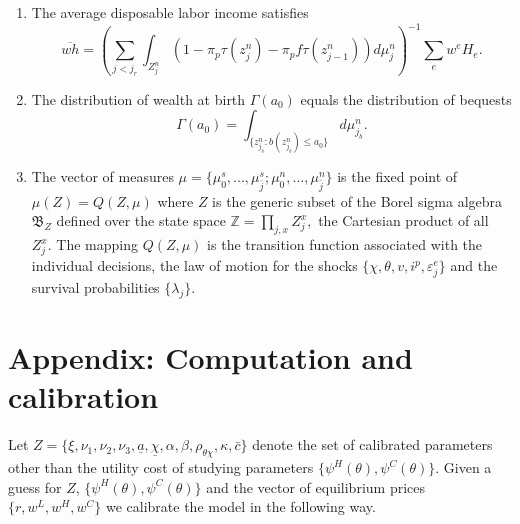 \documentclass[a4paper,dvips,12pt]{article}
\begin{document}
\begin{enumerate}
\item The average disposable labor income satisfies
\begin{equation*}
\overline{wh}=\left(\sum_{j<j_{r}}
\int_{Z^{n}_{j}}(1-\pi_{p}\tau(z^{n}_{j})-\pi_{p}f\tau(z^{n}_{j-1})) d\mu^{n}_{j} \right) ^{-1}
\sum_{e}w^{e}H_{e}.
\end{equation*}

\item The distribution of wealth at birth $\Gamma(a_{0})$ equals the
distribution of bequests
\begin{equation*}
\Gamma(a_{0})=\int_{\{z^{n}_{j_{b}}:b(z^{n}_{j_{b}})\leq
a_{0}\}}d\mu^{n}_{j_{b}}. %
\end{equation*}

\item The vector of measures $\mu=\{\mu^{s}_{0},...,\mu^{s}_{\bar
j};\mu^{n}_{0},...,\mu^{n}_{\bar j}\}$ is the fixed point of $%
\mu(Z)=Q(Z,\mu) $ where $Z$ is the generic subset of the Borel sigma algebra
$\mathfrak{B}_{Z}$ defined over the state space $\mathbb{Z}=\prod_{j,x}
Z^{x}_{j},$ the Cartesian product of all $Z^{x}_{j}.$ The mapping $Q(Z,\mu)$
is the transition function associated with the individual decisions, the law
of motion for the shocks $\{\chi,\theta,v,i^{p},\varepsilon^{e}_{j}\}$ and
the survival probabilities $\{\lambda_{j}\}.$
\end{enumerate}

\section{Appendix: Computation and calibration}

\label{sec:computation}

Let $Z=\{\xi,\nu_{1},\nu_{2},\nu_{3},\underline a,\underline
\chi,\alpha,\beta,\rho_{\theta \chi},\kappa,\bar c\}$ denote the set of
calibrated parameters other than the utility cost of studying parameters $%
\{\psi^{H}(\theta),\psi^{C}(\theta)\}$. Given a guess for $Z$, $%
\{\psi^{H}(\theta),\psi^{C}(\theta)\}$ and the vector of equilibrium prices $%
\{r,w^{L},w^{H},w^{C}\}$ we calibrate the model in the following way.
\end{document}

